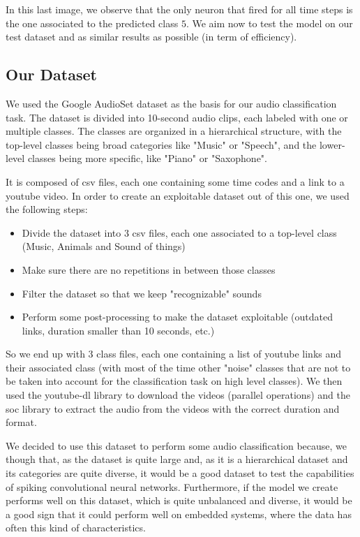 \documentclass[11pt]{article}
\begin{document}
In this last image, we observe that the only neuron that fired for all time steps is the one associated to the predicted class $5$. We aim now to test the model on our test dataset and as similar results as possible (in term of efficiency).

\subsection{Our Dataset}

We used the Google AudioSet dataset as the basis for our audio classification task. The dataset is divided into 10-second audio clips, each labeled with one or multiple classes. The classes are organized in a hierarchical structure, with the top-level classes being broad categories like "Music" or "Speech", and the lower-level classes being more specific, like "Piano" or "Saxophone".

It is composed of csv files, each one containing some time codes and a link to a youtube video. In order to create an exploitable dataset out of this one, we used the following steps:

\begin{itemize}
  \item Divide the dataset into 3 csv files, each one associated to a top-level class (Music, Animals and Sound of things)
  \item Make sure there are no repetitions in between those classes
  \item Filter the dataset so that we keep "recognizable" sounds
  \item Perform some post-processing to make the dataset exploitable (outdated links, duration smaller than 10 seconds, etc.)
\end{itemize}

So we end up with 3 class files, each one containing a list of youtube links and their associated class (with most of the time other "noise" classes that are not to be taken into account for the classification task on high level classes). We then used the youtube-dl library to download the videos (parallel operations) and the soc library to extract the audio from the videos with the correct duration and format.

We decided to use this dataset to perform some audio classification because, we though that, as the dataset is quite large and, as it is a hierarchical dataset and its categories are quite diverse, it would be a good dataset to test the capabilities of spiking convolutional neural networks.
Furthermore, if the model we create performs well on this dataset, which is quite unbalanced and diverse, it would be a good sign that it could perform well on embedded systems, where the data has often this kind of characteristics.
\end{document}
